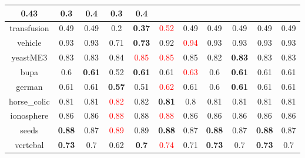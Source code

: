 \documentclass{article}%
\begin{document}
\begin{tabular}{c|cccccccccc}
{0.43
}&0.3&\textbf{0.4}&0.3&\textbf{0.4}\\%
\hline%
transfusion&0.49&0.49&0.2&\textbf{0.37}&\textcolor{red}{ 
0.52
}&0.49&0.49&0.49&0.49&0.49\\%
\hline%
vehicle&0.93&0.93&0.71&\textbf{0.73}&0.92&\textcolor{red}{ 
0.94
}&0.93&0.93&0.93&0.93\\%
\hline%
yeastME3&0.83&0.83&0.84&\textcolor{red}{ 
0.85
}&\textcolor{red}{ 
0.85
}&0.85&0.82&\textbf{0.83}&0.83&0.83\\%
\hline%
bupa&0.6&\textbf{0.61}&0.52&\textbf{0.61}&0.61&\textcolor{red}{ 
0.63
}&0.6&\textbf{0.61}&0.61&0.61\\%
\hline%
german&0.61&0.61&\textbf{0.57}&0.51&\textcolor{red}{ 
0.62
}&0.61&0.6&\textbf{0.61}&0.61&0.61\\%
\hline%
horse\_colic&0.81&0.81&\textcolor{red}{ 
0.82
}&0.82&\textbf{0.81}&0.8&0.81&0.81&0.81&0.81\\%
\hline%
ionosphere&0.86&0.86&\textcolor{red}{ 
0.88
}&0.88&\textcolor{red}{ 
0.88
}&0.86&0.86&0.86&0.86&0.86\\%
\hline%
seeds&\textbf{0.88}&0.87&\textcolor{red}{ 
0.89
}&0.89&\textbf{0.88}&0.87&\textbf{0.88}&0.87&\textbf{0.88}&0.87\\%
\hline%
vertebal&\textbf{0.73}&0.7&0.62&\textbf{0.7}&\textcolor{red}{ 
0.74
}&0.71&\textbf{0.73}&0.7&\textbf{0.73}&0.7\\%
\hline%
\end{tabular}

%
\end{document}
